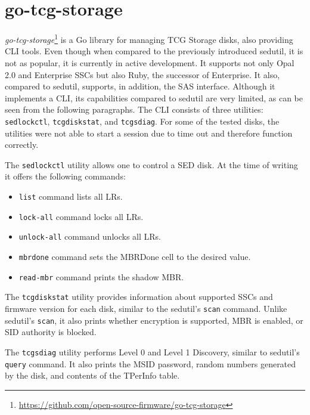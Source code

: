 
\section{go-tcg-storage}

\emph{go-tcg-storage}\footnote{\url{https://github.com/open-source-firmware/go-tcg-storage}} is a Go library for managing TCG Storage disks, also providing CLI tools. Even though when compared to the previously introduced sedutil, it is not as popular, it is currently in active development. It supports not only Opal 2.0 and Enterprise SSCs but also Ruby, the successor of Enterprise. It also, compared to sedutil, supports, in addition, the SAS interface.
Although it implements a CLI, its capabilities compared to sedutil are very limited, as can be seen from the following paragraphs. The CLI consists of three utilities: \verb|sedlockctl|, \verb|tcgdiskstat|, and \verb|tcgsdiag|. 
For some of the tested disks, the utilities were not able to start a session due to time out and therefore function correctly.

The \verb|sedlockctl| utility allows one to control a SED disk. At the time of writing it offers the following commands: \begin{itemize}
 \item \verb|list| command lists all LRs.
 \item \verb|lock-all| command locks all LRs.
 \item \verb|unlock-all| command unlocks all LRs.
 \item \verb|mbrdone| command sets the MBRDone cell to the desired value.
 \item \verb|read-mbr| command prints the shadow MBR.
\end{itemize}

The \verb|tcgdiskstat| utility provides information about supported SSCs and firmware version for each disk, similar to the sedutil's \verb|scan| command. Unlike sedutil's \verb|scan|, it also prints whether encryption is supported, MBR is enabled, or SID authority is blocked.

The \verb|tcgsdiag| utility performs Level 0 and Level 1 Discovery, similar to sedutil's \verb|query| command. It also prints the MSID password, random numbers generated by the disk, and contents of the TPerInfo table. 


